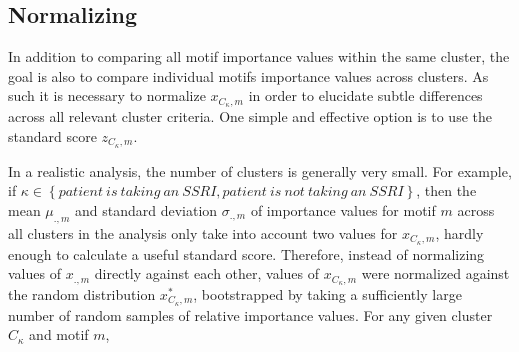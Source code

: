 \subsection{Normalizing}
In addition to comparing all motif importance values within the same cluster, the goal is also to compare individual motifs importance values across clusters. As such it is necessary to normalize $x_{C_\kappa,m}$ in order to elucidate subtle differences across all relevant cluster criteria. One simple and effective option is to use the standard score $z_{C_\kappa,m}$.

In a realistic analysis, the number of clusters is generally very small. For example, if $\kappa \in \left\{patient\ is\ taking\ an\ SSRI,patient\ is\ not\ taking\ an\ SSRI\right\}$, then the mean $\mu_{.,m}$ and standard deviation $\sigma_{.,m}$ of importance values for motif $m$ across all clusters in the analysis only take into account two values for $x_{C_\kappa,m}$, hardly enough to calculate a useful standard score. Therefore, instead of normalizing values of $x_{.,m}$ directly against each other, values of $x_{C_\kappa,m}$ were normalized against the random distribution $x_{C_\kappa,m}^*$, bootstrapped by taking a sufficiently large number of random samples of relative importance values. For any given cluster $C_\kappa$ and motif $m$,

